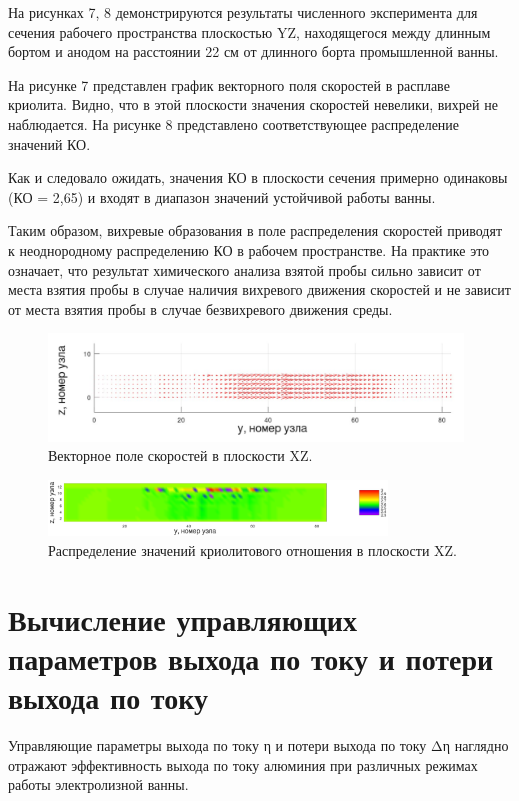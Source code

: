 \documentclass{article}
\begin{document}
На рисунках 7, 8 демонстрируются результаты численного эксперимента для сечения рабочего пространства плоскостью YZ, находящегося между длинным бортом и анодом на расстоянии 22 см от длинного борта промышленной ванны.	

На рисунке 7 представлен график векторного поля скоростей в расплаве криолита. Видно, что в этой плоскости значения скоростей невелики, вихрей не наблюдается. На рисунке 8 представлено соответствующее распределение значений КО.

Как и следовало ожидать, значения КО в плоскости сечения примерно одинаковы (КО = 2,65) и входят в диапазон значений устойчивой работы ванны. 

Таким образом, вихревые образования в поле распределения скоростей приводят к неоднородному распределению КО в рабочем пространстве. На практике это означает, что результат химического анализа взятой пробы сильно зависит от места взятия пробы в случае наличия вихревого движения скоростей и не зависит от места взятия пробы в случае безвихревого движения среды.

\begin{figure}[h!]
    \centering
    \includegraphics[width=110mm]{veloyz_art.png}
    \caption{Векторное поле скоростей в плоскости XZ.}
    \label{fig:3dxyvelo} 
\end{figure}

\begin{figure}[h!]
    \centering
    \includegraphics[width=90mm]{3d yz cr.png}
    \caption{Распределение значений криолитового отношения в плоскости XZ.}
    \label{fig:3dxycr} 
\end{figure}

\section{Вычисление управляющих параметров выхода по току и потери выхода по току}

Управляющие параметры выхода по току η и потери выхода по току Δη наглядно отражают эффективность выхода по току алюминия при различных режимах работы электролизной ванны.
\end{document}
